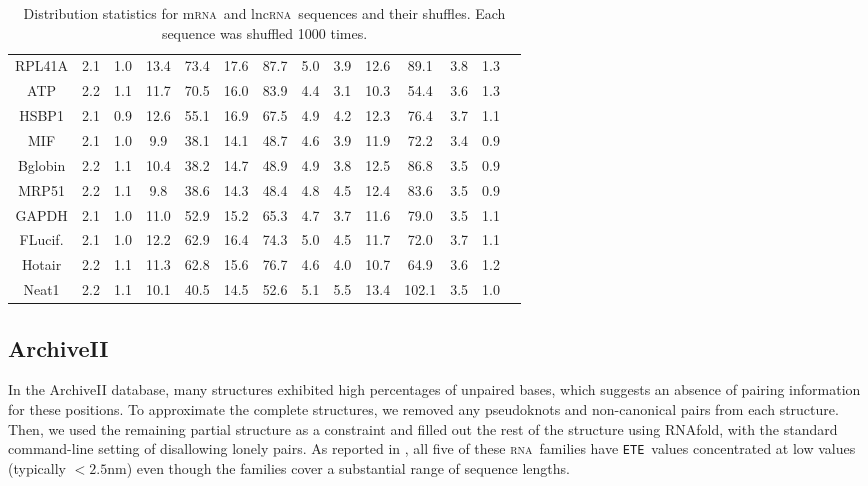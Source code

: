 \documentclass{article}
\newcommand{\RNA}{\textsc{rna}}
\newcommand{\ETE}{{\tt ETE}}
\begin{document}
\begin{table}[h]
\begin{tabular}{cccccccccccccc}
RPL41A & 2.1 & 1.0 & 13.4 & 73.4 & 17.6 & 87.7 & 5.0 & 3.9 & 12.6 & 89.1 & 3.8 & 1.3 \\
ATP    & 2.2 & 1.1 & 11.7 & 70.5 & 16.0 & 83.9 & 4.4 & 3.1 & 10.3 & 54.4 & 3.6 & 1.3 \\
HSBP1  & 2.1 & 0.9 & 12.6 & 55.1 & 16.9 & 67.5 & 4.9 & 4.2 & 12.3 & 76.4 & 3.7 & 1.1 \\
MIF    & 2.1 & 1.0 & 9.9 & 38.1 & 14.1 & 48.7 & 4.6 & 3.9 & 11.9 & 72.2 & 3.4 & 0.9 \\
Bglobin& 2.2 & 1.1 & 10.4 & 38.2 & 14.7 & 48.9 & 4.9 & 3.8 & 12.5 & 86.8 & 3.5 & 0.9 \\
MRP51  & 2.2 & 1.1 & 9.8 & 38.6 & 14.3 & 48.4 & 4.8 & 4.5 & 12.4 & 83.6 & 3.5 & 0.9 \\
GAPDH  & 2.1 & 1.0 & 11.0 & 52.9 & 15.2 & 65.3 & 4.7 & 3.7 & 11.6 & 79.0 & 3.5 & 1.1 \\
FLucif. & 2.1 & 1.0 & 12.2 & 62.9 & 16.4 & 74.3 & 5.0 & 4.5 & 11.7 & 72.0 & 3.7 & 1.1 \\
Hotair & 2.2 & 1.1 & 11.3 & 62.8 & 15.6 & 76.7 & 4.6 & 4.0 & 10.7 & 64.9 & 3.6 & 1.2 \\
Neat1  & 2.2 & 1.1 & 10.1 & 40.5 & 14.5 & 52.6 & 5.1 & 5.5 & 13.4 & 102.1 & 3.5 & 1.0 \\

\bottomrule
\end{tabular}
\caption{Distribution statistics for m\RNA\ and lnc\RNA\ sequences and their shuffles.  Each sequence was shuffled 1000 times.}
\label{table:MathewsStatistics}
\end{table}


\subsection{ArchiveII}

In the ArchiveII database, many structures exhibited high percentages of unpaired bases, which suggests an absence of pairing information for these positions.  To approximate the complete structures, we removed any pseudoknots and non-canonical pairs from each structure.  Then, we used the remaining partial structure as a constraint and filled out the rest of the structure using RNAfold, with the standard command-line setting of disallowing lonely pairs.  As reported in , all five of these \RNA\ families have \ETE\ values concentrated at low values (typically $< 2.5$nm) even though the families cover a substantial range of sequence lengths.  
\end{document}

